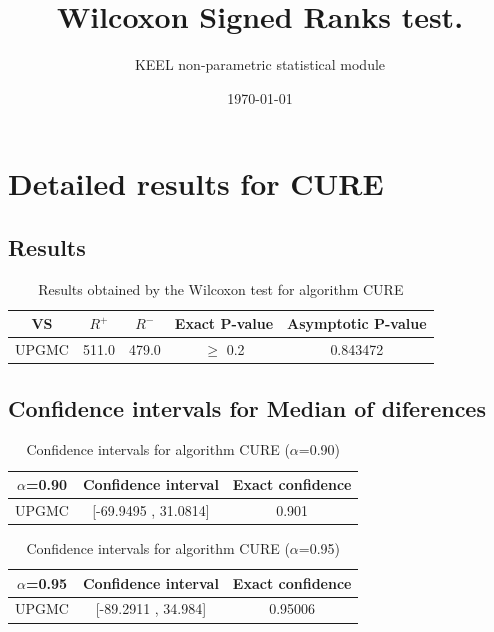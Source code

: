 \documentclass[a4paper,10pt]{article}
\title{Wilcoxon Signed Ranks test.}
\date{\today}
\author{KEEL non-parametric statistical module}
\begin{document}
\pagestyle{empty}
\maketitle
\thispagestyle{empty}



\section{Detailed results for CURE}


\subsection{Results}

\begin{table}[!htp]
\centering\small
\begin{tabular}{
|c|c|c|c|c|}
\hline
 VS & $R^{+}$ & $R^{-}$ & Exact P-value & Asymptotic P-value \\ \hline 
UPGMC & 511.0 & 479.0 & $\geq$ 0.2 & 0.843472\\ \hline 

\end{tabular}
\caption{Results obtained by the Wilcoxon test for algorithm CURE}
\end{table}

\subsection{Confidence intervals for Median of diferences}

\begin{table}[!htp]
\centering\small
\begin{tabular}{
|c|c|c|}
\hline
 $\alpha$=0.90 & Confidence interval & Exact confidence \\ \hline 
UPGMC & [-69.9495 , 31.0814] & 0.901\\ \hline 

\end{tabular}
\caption{Confidence intervals for algorithm CURE ($\alpha$=0.90)}
\end{table}
\begin{table}[!htp]
\centering\small
\begin{tabular}{
|c|c|c|}
\hline
 $\alpha$=0.95 & Confidence interval & Exact confidence \\ \hline 
UPGMC & [-89.2911 , 34.984] & 0.95006\\ \hline 

\end{tabular}
\caption{Confidence intervals for algorithm CURE ($\alpha$=0.95)}
\end{table}
\end{document}
